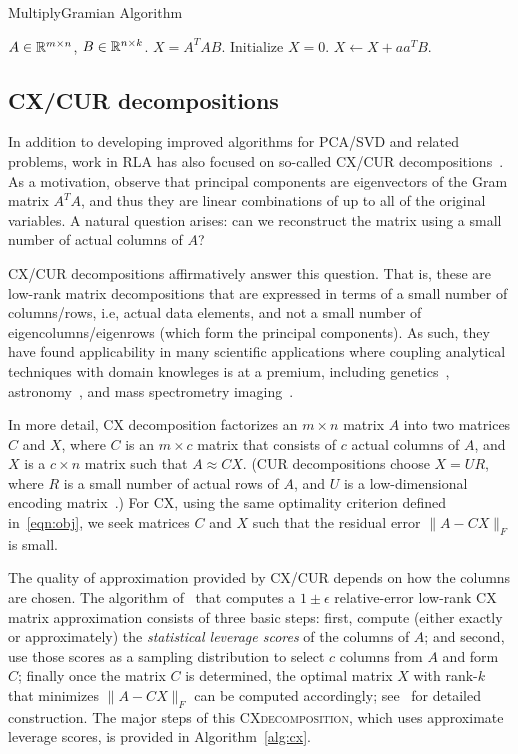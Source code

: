 \begin{algorithm}[tb]
  \caption{{\sc MultiplyGramian} Algorithm}
  \label{alg:gram}
  \begin{algorithmic}[1]
    \Require $A \in \mathbb{R}^{m\times n}$, $B \in \mathbb{R}^{n\times k}$.
    \Ensure $X = A^T A B$.
    \State Initialize $X = 0$.
        \State $X \gets X + a a^T B$.
    \EndFor
  \end{algorithmic}
\end{algorithm}


\subsection{CX/CUR decompositions}

In addition to developing improved algorithms for PCA/SVD and related problems, work in RLA has also focused on so-called CX/CUR decompositions~\cite{DMM08,CUR_PNAS}.
As a motivation, observe that principal components are eigenvectors of the Gram matrix $A^TA$, and thus they are linear combinations of up to all of the original variables.
A natural question arises: can we reconstruct the matrix using a small number of actual columns of $A$?

CX/CUR decompositions affirmatively answer this question.
That is, these are low-rank matrix decompositions that are expressed in terms of a small number of columns/rows, i.e, actual data elements, and not a small number of eigencolumns/eigenrows (which form the principal components).
As such, they have found applicability in many scientific applications where coupling analytical techniques with domain knowleges is at a premium, including genetics~\cite{Paschou07b}, astronomy~\cite{Yip14-AJ}, and mass spectrometry imaging~\cite{YRPMB15}.

In more detail,
CX decomposition factorizes an $m \times n$ matrix $A$ into two matrices $C$ and $X$, where $C$ is an $m\times c$ matrix that consists of $c$ actual columns
of $A$, and $X$ is a $c \times n$ matrix such that $A\approx CX$.
(CUR decompositions choose $X=UR$, where $R$ is a small number of actual rows of $A$, and $U$ is a low-dimensional encoding matrix~\cite{DMM08,CUR_PNAS}.)
For CX, using the same optimality criterion defined in~\eqref{eqn:obj}, we seek matrices $C$ and $X$ such that the residual error $\|A-CX\|_F$ is small.

The quality of approximation provided by CX/CUR depends on how the columns are chosen.
The algorithm of~\cite{DMM08} that computes a $1\pm\epsilon$ relative-error low-rank CX matrix approximation consists of three basic steps: 
first, compute (either exactly or approximately) the {\it statistical leverage scores} of the columns of $A$;
and second, use those scores as a sampling distribution to select $c$ columns from $A$ and form $C$;
finally once the matrix $C$ is determined, the optimal matrix $X$ with rank-$k$ that minimizes $\|A-CX\|_F$ can be computed accordingly; see~\cite{DMM08} for detailed construction.
The major steps of this \textsc{CXdecomposition}, which uses approximate leverage scores, is provided in Algorithm~\ref{alg:cx}.


